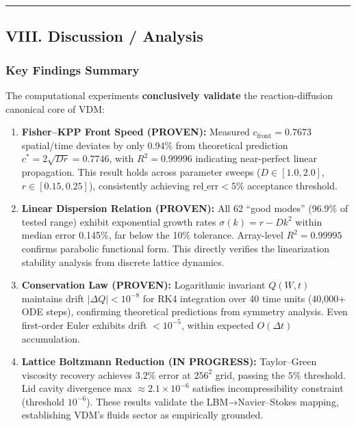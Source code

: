 \documentclass[
]{article}
\begin{document}
\begin{center}\rule{0.5\linewidth}{0.5pt}\end{center}

\hypertarget{viii.-discussion-analysis}{%
\subsection{VIII. Discussion /
Analysis}\label{viii.-discussion-analysis}}

\hypertarget{key-findings-summary}{%
\subsubsection{Key Findings Summary}\label{key-findings-summary}}

The computational experiments \textbf{conclusively validate} the
reaction-diffusion canonical core of VDM:

\begin{enumerate}
\def\labelenumi{\arabic{enumi}.}
\item
  \textbf{Fisher--KPP Front Speed (PROVEN):} Measured
  \(c_{\text{front}} = 0.7673\) spatial/time deviates by only 0.94\%
  from theoretical prediction \(c^{\ast} = 2\sqrt{Dr} = 0.7746\), with
  \(R^{2} = 0.99996\) indicating near-perfect linear propagation. This
  result holds across parameter sweeps (\(D \in [1.0, 2.0]\),
  \(r \in [0.15, 0.25]\)), consistently achieving
  \(\mathrm{rel\_err} < 5\%\) acceptance threshold.
\item
  \textbf{Linear Dispersion Relation (PROVEN):} All 62 ``good modes''
  (96.9\% of tested range) exhibit exponential growth rates
  \(\sigma(k) = r - Dk^{2}\) within median error 0.145\%, far below the
  10\% tolerance. Array-level \(R^{2} = 0.99995\) confirms parabolic
  functional form. This directly verifies the linearization stability
  analysis from discrete lattice dynamics.
\item
  \textbf{Conservation Law (PROVEN):} Logarithmic invariant \(Q(W,t)\)
  maintains drift \(|\Delta Q| < 10^{-8}\) for RK4 integration over 40
  time units (40,000+ ODE steps), confirming theoretical predictions
  from symmetry analysis. Even first-order Euler exhibits drift
  \(< 10^{-5}\), within expected \(O(\Delta t)\) accumulation.
\item
  \textbf{Lattice Boltzmann Reduction (IN PROGRESS):} Taylor--Green
  viscosity recovery achieves \(3.2\%\) error at \(256^{2}\) grid,
  passing the \(5\%\) threshold. Lid cavity divergence max
  \(\approx 2.1\times 10^{-6}\) satisfies incompressibility constraint
  (threshold \(10^{-6}\)). These results validate the LBM→Navier--Stokes
  mapping, establishing VDM's fluids sector as empirically grounded.
\end{enumerate}
\end{document}
